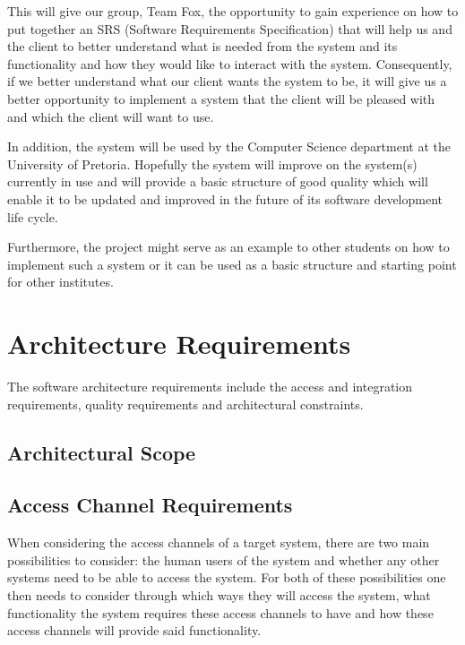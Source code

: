 \documentclass[a4paper,12pt]{article}
\begin{document}
This will give our group, Team Fox, the opportunity to gain experience on how to put together an SRS (Software Requirements Specification) that will help us and the client to better understand what is needed from the system and its functionality and how they would like to interact with the system. Consequently, if we better understand what our client wants the system to be, it will give us a better opportunity to implement a system that the client will be pleased with and which the client will want to use.
 	
In addition, the system will be used by the Computer Science department at the University of Pretoria. Hopefully the system will improve on the system(s) currently in use and will provide a basic structure of good quality which will enable it to be updated and improved in the future of its software development life cycle.
 	
Furthermore, the project might serve as an example to other students on how to implement such a system or it can be used as a basic structure and starting point for other institutes.

\newpage
\section{Architecture Requirements}

The software architecture requirements include the access and integration requirements, quality
requirements and architectural constraints.

\subsection{Architectural Scope}

\subsection{Access Channel Requirements}

When considering the access channels of a target system, there are two main possibilities to consider: the human users of the system and whether any other systems need to be able to access the system. For both of these possibilities one then needs to consider through which ways they will access the system, what functionality the system requires these access channels to have and how these access channels will provide said functionality. 
\end{document}
